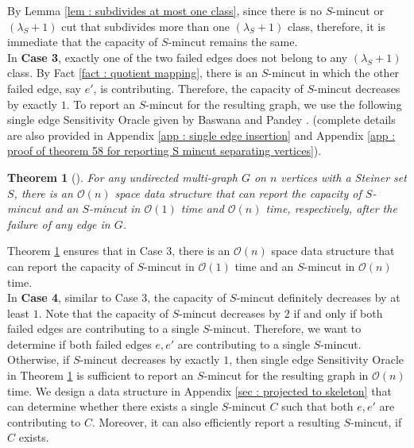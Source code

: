 \documentclass[letterpaper,11pt]{article}
\newtheorem{theorem}{Theorem}[]
\begin{document}
 By Lemma \ref{lem : subdivides at most one class}, since there is no $S$-mincut or $(\lambda_S+1)$ cut that subdivides more than one $(\lambda_S+1)$ class, therefore, it is immediate that the capacity of $S$-mincut remains the same. \\

\noindent
In \textbf{Case 3}, exactly one of the two failed edges does not belong to any $(\lambda_S+1)$ class. By Fact \ref{fact : quotient mapping}, there is an $S$-mincut in which the other failed edge, say $e'$, is contributing. Therefore, the capacity of $S$-mincut decreases by exactly $1$. To report an $S$-mincut for the resulting graph, we use the following single edge Sensitivity Oracle given by Baswana and Pandey \cite{DBLP:conf/soda/BaswanaP22}. (complete details are also provided in Appendix \ref{app : single edge insertion} and Appendix \ref{app : proof of theorem 58 for reporting S mincut separating vertices}).
\begin{theorem} [\cite{DBLP:conf/soda/BaswanaP22}] \label{thm : single edge Sensitivity Oracle} 
    For any undirected multi-graph $G$ on $n$ vertices with a Steiner set $S$, there is an ${\mathcal O}(n)$ space data structure that can report the capacity of $S$-mincut and an $S$-mincut in ${\mathcal O}(1)$ time and ${\mathcal O}(n)$ time, respectively, after the failure of any edge in $G$. 
\end{theorem}
Theorem \ref{thm : single edge Sensitivity Oracle} ensures that in Case 3, there is an ${\mathcal O}(n)$ space data structure that can report the capacity of $S$-mincut in ${\mathcal O}(1)$ time and an $S$-mincut in ${\mathcal O}(n)$ time.\\


\noindent
In \textbf{Case 4},
similar to Case $3$, the capacity of $S$-mincut definitely decreases by at least $1$.
Note that the capacity of $S$-mincut decreases by $2$ if and only if both failed edges are contributing to a single $S$-mincut. Therefore, we want to determine if both failed edges $e,e'$ are contributing to a single $S$-mincut. Otherwise, if $S$-mincut decreases by exactly $1$, then single edge Sensitivity Oracle in Theorem \ref{thm : single edge Sensitivity Oracle} is sufficient to report an $S$-mincut for the resulting graph in ${\mathcal O}(n)$ time. We design a data structure in Appendix \ref{sec : projected to skeleton} that can determine whether there exists a single $S$-mincut $C$ such that both $e,e'$ are contributing to $C$. Moreover, it can also efficiently report a resulting $S$-mincut, if $C$ exists. 
\end{document}
